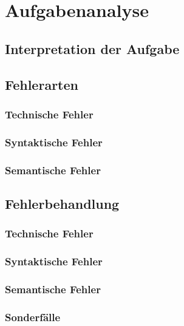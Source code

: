 \chapter{Aufgabenanalyse}\label{ch:aufgabenanalyse}


\section{Interpretation der Aufgabe}\label{sec:interpretation-der-aufgabe}


\section{Fehlerarten}\label{sec:fehlerarten}

\subsection{Technische Fehler}\label{subsec:technische-fehler}

\subsection{Syntaktische Fehler}\label{subsec:syntaktische-fehler}

\subsection{Semantische Fehler}\label{subsec:semantische-fehler}


\section{Fehlerbehandlung}\label{sec:fehlerbehandlung}

\subsection{Technische Fehler}\label{subsec:technische-fehler-behandlung}

\subsection{Syntaktische Fehler}\label{subsec:syntaktische-fehler-behandlung}

\subsection{Semantische Fehler}\label{subsec:semantische-fehler-behandlung}

\subsection{Sonderfälle}\label{subsec:sonderfaelle}
